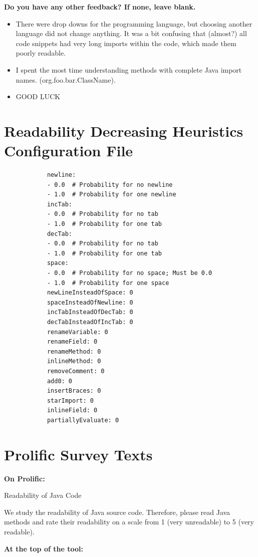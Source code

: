 \documentclass[%
class=scrreprt,
chapterprefix=false,%
open=right,%
twoside=false,%
paper=a4,%
logofile={Logo\_zentral\_farbig\_EN.png},%
thesistype=master,%
UKenglish,%
]{se2thesis}
\theoremstyle{definition}
\begin{document}
	\textbf{Do you have any other feedback? If none, leave blank.}
	\begin{itemize}
		\item There were drop downs for the programming language, but choosing another language did not change anything. It was a bit confusing that (almost?) all code snippets had very long imports within the code, which made them poorly readable.
		\item I spent the most time understanding methods with complete Java import names. (org.foo.bar.ClassName).
		\item GOOD LUCK
	\end{itemize}
	
\pagebreak
\section{Readability Decreasing Heuristics Configuration File}\label{appendix:rdh-config-file}
	\begin{listing}[h!]
		\begin{verbatim}
			newline:
			- 0.0  # Probability for no newline
			- 1.0  # Probability for one newline
			incTab:
			- 0.0  # Probability for no tab
			- 1.0  # Probability for one tab
			decTab:
			- 0.0  # Probability for no tab
			- 1.0  # Probability for one tab
			space:
			- 0.0  # Probability for no space; Must be 0.0
			- 1.0  # Probability for one space
			newLineInsteadOfSpace: 0
			spaceInsteadOfNewline: 0
			incTabInsteadOfDecTab: 0
			decTabInsteadOfIncTab: 0
			renameVariable: 0
			renameField: 0
			renameMethod: 0
			inlineMethod: 0
			removeComment: 0
			add0: 0
			insertBraces: 0
			starImport: 0
			inlineField: 0
			partiallyEvaluate: 0
		\end{verbatim}
		\label{lst:rdh-config-file}
	\end{listing}
	
\pagebreak
\section{Prolific Survey Texts}\label{appendix:prolific-survey-texts}
	\textbf{On Prolific:}
	
	Readability of Java Code
	
	We study the readability of Java source code. Therefore, please read Java methods and rate their readability on a scale from 1 (very unreadable) to 5 (very readable).
	
	\textbf{At the top of the tool:}
	
\end{document}
